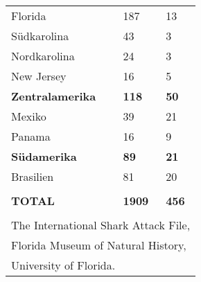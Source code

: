 {\begin{tabular}{|p{2.5cm}p{0.7cm}p{0.7cm}|}
    Florida & 187 & 13 \\
    Südkarolina & 43 & 3 \\
    Nordkarolina & 24 & 3 \\
    New Jersey & 16 & 5 \\
    \textbf{Zentralamerika} & \textbf{118} & \textbf{50} \\
    Mexiko & 39 & 21 \\
    Panama & 16 & 9 \\
    \textbf{Südamerika} & \textbf{89} & \textbf{21} \\
    Brasilien & 81 & 20 \\
    & & \\
    \textbf{TOTAL} & \textbf{1909} & \textbf{456} \\
    & & \\
    \multicolumn{3}{|l|}{The International Shark Attack File,} \\
    \multicolumn{3}{|l|}{Florida Museum of Natural History,} \\
    \multicolumn{3}{|l|}{University of Florida.} \\
    \hline
  \end{tabular}
}

